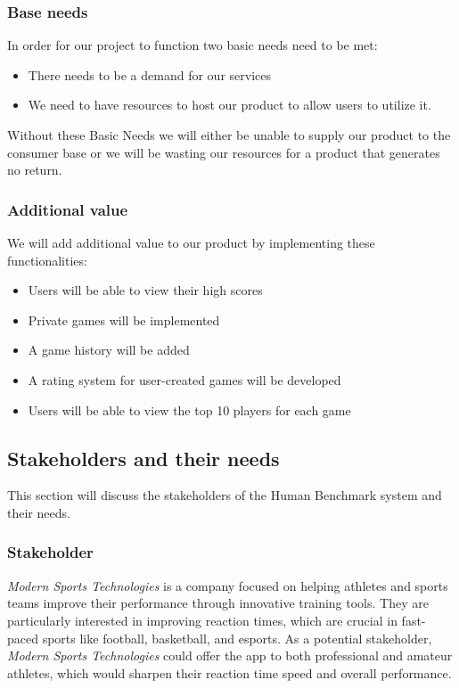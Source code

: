 \documentclass[]{VUMIFTemplateClass}
\begin{document}
\subsubsection{Base needs}

In order for our project to function two basic needs need to be met:
\begin{itemize}
 \item There needs to be a demand for our services
 \item We need to have resources to host our product to allow users to utilize it.
\end{itemize}

Without these Basic Needs we will either be unable to supply our product to the consumer base or we will be wasting our resources for a product that generates no return.

\subsubsection{Additional value}
 We will add additional value to our product by implementing these functionalities:
 \begin{itemize}
  \item Users will be able to view their high scores
  \item Private games will be implemented
  \item A game history will be added
  \item A rating system for user-created games will be developed
  \item Users will be able to view the top 10 players for each game
 \end{itemize}


\subsection{Stakeholders and their needs}
This section will discuss the stakeholders of the Human Benchmark system and their needs.

\subsubsection{Stakeholder}
\textit{Modern Sports Technologies} is a company focused on helping athletes and sports teams improve their performance through innovative training tools. They are particularly interested in improving reaction times, which are crucial in fast-paced sports like football, basketball, and esports. As a potential stakeholder, \textit{Modern Sports Technologies} could offer the app to both professional and amateur athletes, which would sharpen their reaction time speed and overall performance.
\end{document}
